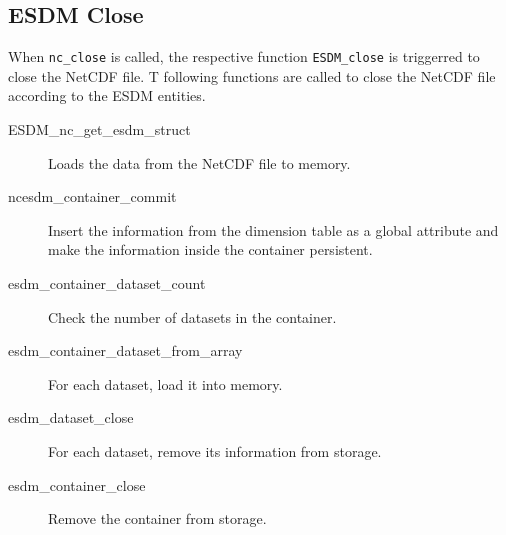 \subsection{ESDM Close}

When \texttt{nc\_close} is called, the respective function \texttt{ESDM\_close} is triggerred to close the NetCDF file.
T following functions are called to close the NetCDF file according to the ESDM entities.

\begin{description}

\item[ESDM\_nc\_get\_esdm\_struct]

Loads the data from the NetCDF file to memory.

\item[ncesdm\_container\_commit]

Insert the information from the dimension table as a global attribute and make the information inside the container persistent.

\item[esdm\_container\_dataset\_count]

Check the number of datasets in the container.

\item[esdm\_container\_dataset\_from\_array]

For each dataset, load it into memory.

\item[esdm\_dataset\_close]

For each dataset, remove its information from storage.

\item[esdm\_container\_close]

Remove the container from storage.

\end{description}

